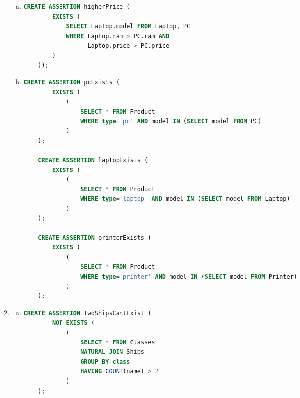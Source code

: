\documentclass[12pt]{article}
\begin{document}
\begin{enumerate}[1.]
\begin{enumerate}[a)]
        \item

    \begin{lstlisting}[language=SQL]
    CREATE ASSERTION higherPrice (
        EXISTS (
            SELECT Laptop.model FROM Laptop, PC
            WHERE Laptop.ram > PC.ram AND
                  Laptop.price > PC.price
        )
    ));
    \end{lstlisting}

        \item

    \begin{lstlisting}[language=SQL]
    CREATE ASSERTION pcExists (
        EXISTS (
            (
                SELECT * FROM Product
                WHERE type='pc' AND model IN (SELECT model FROM PC)
            )
    );

    CREATE ASSERTION laptopExists (
        EXISTS (
            (
                SELECT * FROM Product
                WHERE type='laptop' AND model IN (SELECT model FROM Laptop)
            )
    );

    CREATE ASSERTION printerExists (
        EXISTS (
            (
                SELECT * FROM Product
                WHERE type='printer' AND model IN (SELECT model FROM Printer)
            )
    );
    \end{lstlisting}



    \end{enumerate}

    \item

    \begin{enumerate}[a)]
        \item

    \begin{lstlisting}[language=SQL]
    CREATE ASSERTION twoShipsCantExist (
        NOT EXISTS (
            (
                SELECT * FROM Classes
                NATURAL JOIN Ships
                GROUP BY class
                HAVING COUNT(name) > 2
            )
    );
    \end{lstlisting}
    \end{enumerate}

\end{enumerate}
\end{document}
